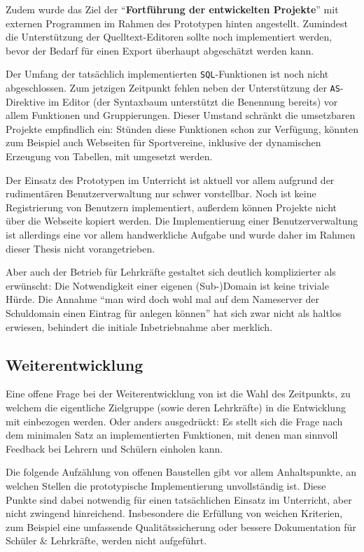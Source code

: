 Zudem wurde das Ziel der "`\textbf{Fortführung der entwickelten Projekte}"' mit externen Programmen im Rahmen des Prototypen hinten angestellt. Zumindest die Unterstützung der Quelltext-Editoren sollte noch implementiert werden, bevor der Bedarf für einen Export überhaupt abgeschätzt werden kann.

Der Umfang der tatsächlich implementierten \texttt{SQL}-Funktionen ist noch nicht abgeschlossen. Zum jetzigen Zeitpunkt fehlen neben der Unterstützung der \texttt{AS}-Direktive im Editor (der Syntaxbaum unterstützt die Benennung bereits) vor allem Funktionen und Gruppierungen. Dieser Umstand schränkt die umsetzbaren Projekte empfindlich ein: Stünden diese Funktionen schon zur Verfügung, könnten zum Beispiel auch Webseiten für Sportvereine, inklusive der dynamischen Erzeugung von Tabellen, mit \idename{} umgesetzt werden.

Der Einsatz des Prototypen im Unterricht ist aktuell vor allem aufgrund der rudimentären Benutzerverwaltung nur schwer vorstellbar. Noch ist keine Registrierung von Benutzern implementiert, außerdem können Projekte nicht über die Webseite kopiert werden. Die Implementierung einer Benutzerverwaltung ist allerdings eine vor allem handwerkliche Aufgabe und wurde daher im Rahmen dieser Thesis nicht vorangetrieben.

Aber auch der Betrieb für Lehrkräfte gestaltet sich deutlich komplizierter als erwünscht: Die Notwendigkeit einer eigenen (Sub-)Domain ist keine triviale Hürde. Die Annahme "`man wird doch wohl mal auf dem Nameserver der Schuldomain einen Eintrag für \idename{} anlegen können"' hat sich zwar nicht als haltlos erwiesen, behindert die initiale Inbetriebnahme aber merklich.

\subsection{Weiterentwicklung}

Eine offene Frage bei der Weiterentwicklung von \idename{} ist die Wahl des Zeitpunkts, zu welchem die eigentliche Zielgruppe (sowie deren Lehrkräfte) in die Entwicklung mit einbezogen werden. Oder anders ausgedrückt: Es stellt sich die Frage nach dem minimalen Satz an implementierten Funktionen, mit denen man sinnvoll Feedback bei Lehrern und Schülern einholen kann.

Die folgende Aufzählung von offenen Baustellen gibt vor allem Anhaltspunkte, an welchen Stellen die prototypische Implementierung unvollständig ist. Diese Punkte sind dabei notwendig für einen tatsächlichen Einsatz im Unterricht, aber nicht zwingend hinreichend. Insbesondere die Erfüllung von weichen Kriterien, zum Beispiel eine umfassende Qualitätssicherung oder bessere Dokumentation für Schüler \& Lehrkräfte, werden nicht aufgeführt.

